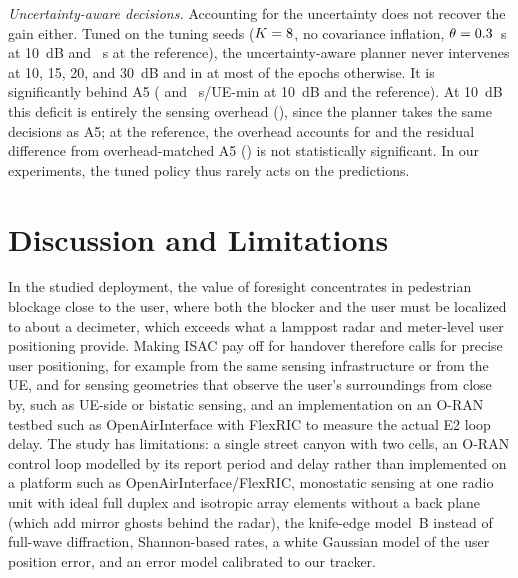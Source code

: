 \documentclass[conference]{IEEEtran}
\begin{document}
\textit{Uncertainty-aware decisions.} Accounting for the uncertainty
does not recover the gain either. Tuned on the tuning seeds ($K=8$,
no covariance inflation, $\theta=0.3$~s at \SI{10}{dB} and
\numUAThetaRef~s at the reference), the uncertainty-aware planner never
intervenes at 10, 15, 20, and \SI{30}{dB} and in at most
\numUAPlanIntervene{} of the epochs otherwise. It is significantly behind
A5 (\numUAPlanTen{} and \numUAPlanRef~s/UE-min at \SI{10}{dB} and the
reference). At \SI{10}{dB} this deficit is entirely the sensing overhead
(\numAfiveOHTen), since the planner takes the same decisions as A5; at
the reference, the overhead accounts for \numAfiveOHRef{} and the
residual difference from overhead-matched A5 (\numUAvsOHRef) is not
statistically significant. In our experiments, the tuned policy thus
rarely acts on the predictions.

\section{Discussion and Limitations}
In the studied deployment, the value of foresight concentrates in
pedestrian blockage close to the user, where both the blocker and the
user must be localized to about a decimeter, which exceeds what a
lamppost radar and meter-level user positioning provide. Making ISAC pay
off for handover therefore calls for precise user positioning, for
example from the same sensing infrastructure or from the UE, and for
sensing geometries that observe the user's surroundings from close by,
such as UE-side or bistatic sensing, and an implementation on an O-RAN
testbed such as OpenAirInterface with FlexRIC to measure the actual E2
loop delay. The study has limitations: a single
street canyon with two cells, an O-RAN control loop modelled by its
report period and delay rather than implemented on a platform such as
OpenAirInterface/FlexRIC, monostatic sensing at one radio unit with
ideal full duplex and isotropic array elements without a back plane
(which add mirror ghosts behind the radar), the knife-edge model~B
instead of full-wave diffraction, Shannon-based rates, a white Gaussian
model of the user position error, and an error model calibrated to our
tracker.

\end{document}
